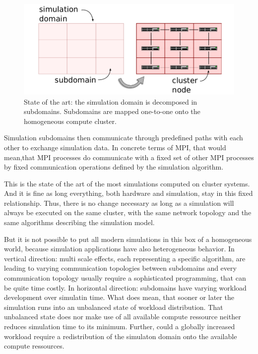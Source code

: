   \begin{figure}[H]
    \centering \includegraphics[width=\textwidth]{graphics/30_state_of_the_art}
    \caption{State of the art: the simulation domain is decomposed in subdomains. Subdomains 
    are mapped one-to-one onto the homogeneous compute cluster.}
    \label{fig:state_of_the_art}
  \end{figure}

  Simulation subdomains then communicate through predefined paths with
  each other to exchange simulation data. In concrete terms of MPI,
  that would mean,that MPI processes do communicate with a fixed set
  of other MPI processes by fixed communication operations defined by
  the simulation algorithm.

  This is the state of the art of the most simulations computed on
  cluster systems. And it is fine as long everything, both hardware
  and simulation, stay in this fixed relationship. Thus, there is no
  change necessary as long as a simulation will always be
  executed on the same cluster, with the same network topology
  and the same algorithms describing the simulation model. 

  But it is not possible to put all modern simulations in this box of
  a homogeneous world, because simulation applications have also
  heterogeneous behavior.  In vertical direction: multi scale effects,
  each representing a specific algorithm, are leading to varying
  communication topologies between subdomains and every communication
  topology usually require a sophisticated programming, that can be
  quite time costly.  In horizontal direction: subdomains have varying
  workload development over simulatin time. What does mean, that
  sooner or later the simulation runs into an unbalanced state of
  workload distribution. That unbalanced state does nor make use of
  all available compute ressource neither reduces simulation time to
  its minimum. Further, could a globally increased workload require a
  redistribution of the simulaton domain onto the available compute
  ressources.

